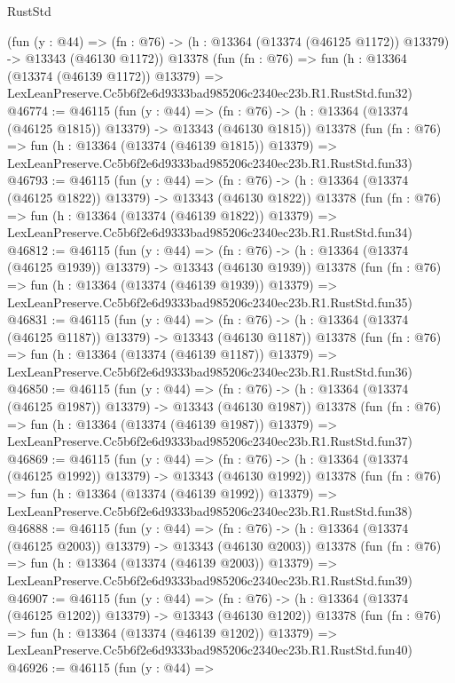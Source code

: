 \begin{lexlean}{RustStd}
\begin{coremodule}
    (fun (y : @44) =>
    (fn : @76) -> (h : @13364 (@13374 (@46125 @1172)) @13379) -> @13343 (@46130 @1172))
    @13378
    (fun (fn : @76) =>
    fun (h : @13364 (@13374 (@46139 @1172)) @13379) =>
    LexLeanPreserve.Cc5b6f2e6d9333bad985206c2340ec23b.R1.RustStd.fun32)
@46774 := @46115
    (fun (y : @44) =>
    (fn : @76) -> (h : @13364 (@13374 (@46125 @1815)) @13379) -> @13343 (@46130 @1815))
    @13378
    (fun (fn : @76) =>
    fun (h : @13364 (@13374 (@46139 @1815)) @13379) =>
    LexLeanPreserve.Cc5b6f2e6d9333bad985206c2340ec23b.R1.RustStd.fun33)
@46793 := @46115
    (fun (y : @44) =>
    (fn : @76) -> (h : @13364 (@13374 (@46125 @1822)) @13379) -> @13343 (@46130 @1822))
    @13378
    (fun (fn : @76) =>
    fun (h : @13364 (@13374 (@46139 @1822)) @13379) =>
    LexLeanPreserve.Cc5b6f2e6d9333bad985206c2340ec23b.R1.RustStd.fun34)
@46812 := @46115
    (fun (y : @44) =>
    (fn : @76) -> (h : @13364 (@13374 (@46125 @1939)) @13379) -> @13343 (@46130 @1939))
    @13378
    (fun (fn : @76) =>
    fun (h : @13364 (@13374 (@46139 @1939)) @13379) =>
    LexLeanPreserve.Cc5b6f2e6d9333bad985206c2340ec23b.R1.RustStd.fun35)
@46831 := @46115
    (fun (y : @44) =>
    (fn : @76) -> (h : @13364 (@13374 (@46125 @1187)) @13379) -> @13343 (@46130 @1187))
    @13378
    (fun (fn : @76) =>
    fun (h : @13364 (@13374 (@46139 @1187)) @13379) =>
    LexLeanPreserve.Cc5b6f2e6d9333bad985206c2340ec23b.R1.RustStd.fun36)
@46850 := @46115
    (fun (y : @44) =>
    (fn : @76) -> (h : @13364 (@13374 (@46125 @1987)) @13379) -> @13343 (@46130 @1987))
    @13378
    (fun (fn : @76) =>
    fun (h : @13364 (@13374 (@46139 @1987)) @13379) =>
    LexLeanPreserve.Cc5b6f2e6d9333bad985206c2340ec23b.R1.RustStd.fun37)
@46869 := @46115
    (fun (y : @44) =>
    (fn : @76) -> (h : @13364 (@13374 (@46125 @1992)) @13379) -> @13343 (@46130 @1992))
    @13378
    (fun (fn : @76) =>
    fun (h : @13364 (@13374 (@46139 @1992)) @13379) =>
    LexLeanPreserve.Cc5b6f2e6d9333bad985206c2340ec23b.R1.RustStd.fun38)
@46888 := @46115
    (fun (y : @44) =>
    (fn : @76) -> (h : @13364 (@13374 (@46125 @2003)) @13379) -> @13343 (@46130 @2003))
    @13378
    (fun (fn : @76) =>
    fun (h : @13364 (@13374 (@46139 @2003)) @13379) =>
    LexLeanPreserve.Cc5b6f2e6d9333bad985206c2340ec23b.R1.RustStd.fun39)
@46907 := @46115
    (fun (y : @44) =>
    (fn : @76) -> (h : @13364 (@13374 (@46125 @1202)) @13379) -> @13343 (@46130 @1202))
    @13378
    (fun (fn : @76) =>
    fun (h : @13364 (@13374 (@46139 @1202)) @13379) =>
    LexLeanPreserve.Cc5b6f2e6d9333bad985206c2340ec23b.R1.RustStd.fun40)
@46926 := @46115
    (fun (y : @44) =>

\end{coremodule}
\end{lexlean}
